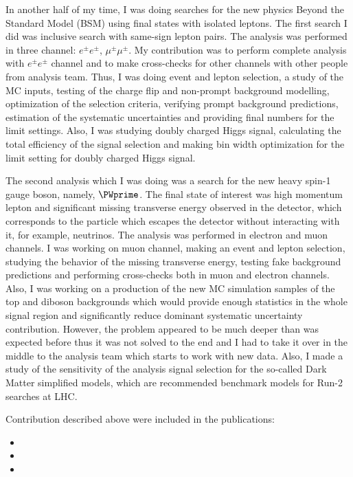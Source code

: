 \begin{preface}
In another half of my time, I was doing searches for the new physics Beyond the Standard Model (BSM) using final states with isolated leptons. The first search I did was inclusive search with same-sign lepton pairs. The analysis was performed in three channel: $e^{\pm}e^{\pm}$, $\mu^{\pm}\mu^{\pm}$. My contribution was to perform complete analysis with $e^{\pm}e^{\pm}$ channel and to make cross-checks for other channels with other people from analysis team. Thus, I was doing event and lepton selection, a study of the MC inputs, testing of the charge flip and non-prompt background modelling, optimization of the selection criteria, verifying prompt background predictions, estimation of the systematic uncertainties and providing final numbers for the limit settings. Also, I was studying doubly charged Higgs signal, calculating the total efficiency of the signal selection and making bin width optimization for the limit setting for doubly charged Higgs signal.

The second analysis which I was doing was a search for the new heavy spin-1 gauge boson, namely, $\PWprime$. The final state of interest was high momentum lepton and significant missing transverse energy observed in the detector, which corresponds to the particle which escapes the detector without interacting with it, for example, neutrinos.  The analysis was performed in electron and muon channels.
I was working on muon channel, making an event and lepton selection, studying the behavior of the missing transverse energy, testing fake background predictions and performing cross-checks both in muon and electron channels. Also, I was working on a production of the new MC simulation samples of the top and diboson backgrounds which would provide enough statistics in the whole signal region and significantly reduce dominant systematic uncertainty contribution. However, the problem appeared to be much deeper than was expected before thus it was not solved to the end and I had to take it over in the middle to the analysis team which starts to work with new data.
Also, I made a study of the sensitivity of the analysis signal selection for the so-called Dark Matter simplified models, which are recommended benchmark models for Run-2 searches at LHC. 

Contribution described above were included in the publications:
\begin{itemize}
 \item {}
 \item {}
 \item {}
\end{itemize}


\end{preface}
